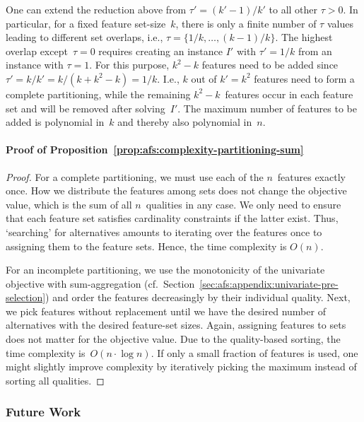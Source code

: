 \documentclass{article}
\theoremstyle{definition}
\begin{document}
One can extend the reduction above from $\tau' = (k' - 1) / k'$ to all other $\tau > 0$.
In particular, for a fixed feature set-size~$k$, there is only a finite number of $\tau$ values leading to different set overlaps, i.e., $\tau = \{1/k, \dots, (k - 1) / k\}$.
The highest overlap except~$\tau=0$ requires creating an instance $I'$ with $\tau'= 1/k$ from an instance with $\tau = 1$.
For this purpose, $k^2 - k$ features need to be added since $\tau' = k / k' = k / (k + k^2 -k) = 1/k$.
I.e., $k$ out of $k' = k^2$ features need to form a complete partitioning, while the remaining $k^2 - k$~features occur in each feature set and will be removed after solving~$I'$.
The maximum number of features to be added is polynomial in~$k$ and thereby also polynomial in~$n$.

\paragraph{Proof of Proposition~\ref{prop:afs:complexity-partitioning-sum}}
%
\begin{proof}
For a complete partitioning, we must use each of the $n$~features exactly once.
How we distribute the features among sets does not change the objective value, which is the sum of all $n$~qualities in any case.
We only need to ensure that each feature set satisfies cardinality constraints if the latter exist.
Thus, `searching' for alternatives amounts to iterating over the features once to assigning them to the feature sets.
Hence, the time complexity is $O(n)$.

For an incomplete partitioning, we use the monotonicity of the univariate objective with sum-aggregation (cf.~Section~\ref{sec:afs:appendix:univariate-pre-selection}) and order the features decreasingly by their individual quality.
Next, we pick features without replacement until we have the desired number of alternatives with the desired feature-set sizes.
Again, assigning features to sets does not matter for the objective value.
Due to the quality-based sorting, the time complexity is~$O(n \cdot \log n)$.
If only a small fraction of features is used, one might slightly improve complexity by iteratively picking the maximum instead of sorting all qualities.
\end{proof}

\subsubsection{Future Work}
\label{sec:afs:appendix:complexity:future-work}
\end{document}
